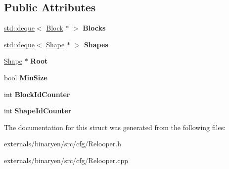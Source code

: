 \subsection*{Public Attributes}
\begin{DoxyCompactItemize}
\item 
\mbox{\label{struct_c_f_g_1_1_relooper_a20ef8c0e25f12d9aca6aff77cbe5ddc1}} 
\mbox{\hyperlink{classstd_1_1deque}{std\+::deque}}$<$ \mbox{\hyperlink{struct_c_f_g_1_1_block}{Block}} $\ast$ $>$ {\bfseries Blocks}
\item 
\mbox{\label{struct_c_f_g_1_1_relooper_a9e17e2c6a25c077c9ebb482fc80bebee}} 
\mbox{\hyperlink{classstd_1_1deque}{std\+::deque}}$<$ \mbox{\hyperlink{struct_c_f_g_1_1_shape}{Shape}} $\ast$ $>$ {\bfseries Shapes}
\item 
\mbox{\label{struct_c_f_g_1_1_relooper_a83897d55756dd22e1b6b08eda9a9cfb3}} 
\mbox{\hyperlink{struct_c_f_g_1_1_shape}{Shape}} $\ast$ {\bfseries Root}
\item 
\mbox{\label{struct_c_f_g_1_1_relooper_a46a375da3ca4f68e55c25ffff27c5180}} 
bool {\bfseries Min\+Size}
\item 
\mbox{\label{struct_c_f_g_1_1_relooper_afafa9d122e82fb56b0c01e427f11ed95}} 
int {\bfseries Block\+Id\+Counter}
\item 
\mbox{\label{struct_c_f_g_1_1_relooper_ab07ad584630bf6795fb314d9dd4c7c6f}} 
int {\bfseries Shape\+Id\+Counter}
\end{DoxyCompactItemize}


The documentation for this struct was generated from the following files\+:\begin{DoxyCompactItemize}
\item 
externals/binaryen/src/cfg/Relooper.\+h\item 
externals/binaryen/src/cfg/Relooper.\+cpp\end{DoxyCompactItemize}
